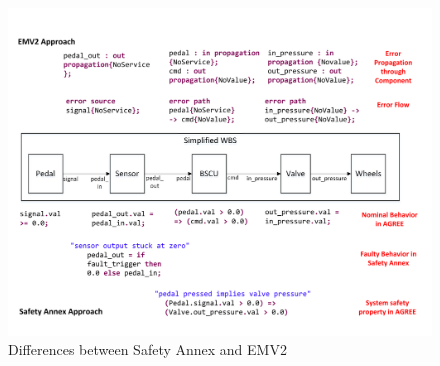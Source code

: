 \begin{figure}[t]
	\vspace{-0.19in}
	\centering
	\includegraphics[trim=0 9 0 5,clip,width=\textwidth]{images/Comparison_with_EMV2.pdf}
	\caption{Differences between Safety Annex and EMV2}
	\label{fig:comparison_with_EMV2}
\end{figure} 
 



